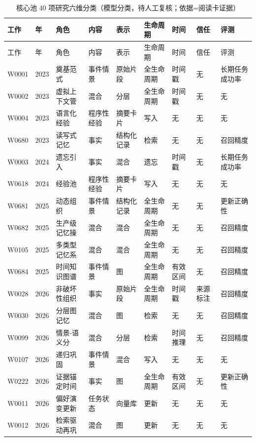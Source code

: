 \begin{small}
\begin{longtable}{p{1.0cm}p{0.5cm}p{1.8cm}p{1.4cm}p{1.4cm}p{1.3cm}p{1.2cm}p{1.2cm}p{1.4cm}}
\caption{核心池 40 项研究六维分类（模型分类，待人工复核；依据=阅读卡证据）}\label{tab:methods}\\
\toprule
工作 & 年 & 角色 & 内容 & 表示 & 生命周期 & 时间 & 信任 & 评测 \\
\midrule\endfirsthead
\toprule
工作 & 年 & 角色 & 内容 & 表示 & 生命周期 & 时间 & 信任 & 评测 \\
\midrule\endhead
\bottomrule\endfoot
W0001 & 2023 & 奠基范式 & 事件情景 & 原始片段 & 全生命周期 & 时间戳 & 无 & 长期任务成功率 \\
W0002 & 2023 & 虚拟上下文管 & 混合 & 分层 & 全生命周期 & 时间戳 & 无 & 无 \\
W0004 & 2023 & 语言化经验 & 程序性经验 & 摘要卡片 & 写入 & 无 & 无 & 无 \\
W0680 & 2023 & 读写式记忆 & 事实 & 结构化记录 & 检索 & 无 & 无 & 召回精度 \\
W0003 & 2024 & 遗忘引入 & 事实 & 混合 & 遗忘 & 时间戳 & 无 & 长期任务成功率 \\
W0618 & 2024 & 经验池 & 程序性经验 & 摘要卡片 & 写入 & 无 & 无 & 无 \\
W0681 & 2025 & 动态组织 & 事件情景 & 结构化记录 & 全生命周期 & 无 & 无 & 更新正确性 \\
W0682 & 2025 & 生产级记忆操 & 混合 & 混合 & 全生命周期 & 无 & 无 & 召回精度 \\
W0105 & 2025 & 多类型记忆系 & 混合 & 混合 & 全生命周期 & 无 & 无 & 召回精度 \\
W0684 & 2025 & 时间知识图谱 & 事件情景 & 图 & 全生命周期 & 有效区间 & 无 & 召回精度 \\
W0028 & 2026 & 非破坏性组织 & 事实 & 原始片段 & 全生命周期 & 时间戳 & 来源标注 & 召回精度 \\
W0030 & 2026 & 分层图记忆 & 混合 & 图 & 检索 & 无 & 无 & 召回精度 \\
W0099 & 2026 & 情景-语义分 & 混合 & 分层 & 检索 & 时间推理 & 无 & 召回精度 \\
W0107 & 2026 & 递归巩固 & 事件情景 & 混合 & 写入 & 无 & 无 & 无 \\
W0222 & 2026 & 证据锚定时间 & 事实 & 图 & 全生命周期 & 有效区间 & 无 & 更新正确性 \\
W0011 & 2026 & 偏好演变更新 & 任务状态 & 向量库 & 更新 & 无 & 无 & 无 \\
W0012 & 2026 & 检索驱动再巩 & 混合 & 图 & 更新 & 无 & 无 & 无 \\

\end{longtable}
\end{small}
